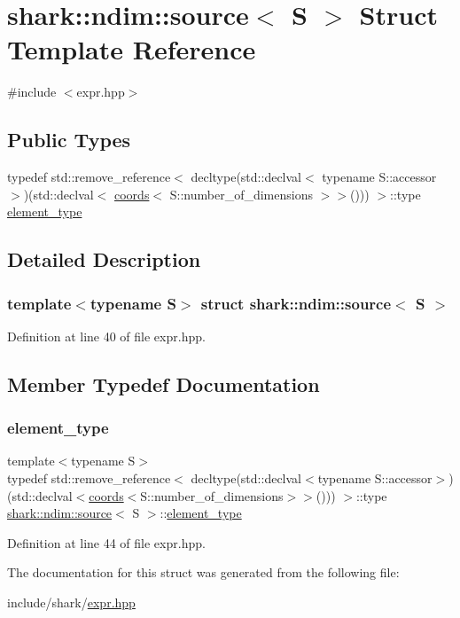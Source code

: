 \hypertarget{structshark_1_1ndim_1_1source}{}\section{shark\+:\+:ndim\+:\+:source$<$ S $>$ Struct Template Reference}
\label{structshark_1_1ndim_1_1source}


{\ttfamily \#include $<$expr.\+hpp$>$}

\subsection*{Public Types}
\begin{DoxyCompactItemize}
\item 
typedef std\+::remove\+\_\+reference$<$ decltype(std\+::declval$<$ typename S\+::accessor $>$)(std\+::declval$<$ \hyperlink{structshark_1_1ndim_1_1coords}{coords}$<$ S\+::number\+\_\+of\+\_\+dimensions $>$$>$())) $>$\+::type \hyperlink{structshark_1_1ndim_1_1source_a088361f7853e6136e1a6fbe5abc17aa3}{element\+\_\+type}
\end{DoxyCompactItemize}


\subsection{Detailed Description}
\subsubsection*{template$<$typename S$>$\newline
struct shark\+::ndim\+::source$<$ S $>$}



Definition at line 40 of file expr.\+hpp.



\subsection{Member Typedef Documentation}
\hypertarget{structshark_1_1ndim_1_1source_a088361f7853e6136e1a6fbe5abc17aa3}{}\label{structshark_1_1ndim_1_1source_a088361f7853e6136e1a6fbe5abc17aa3} 
\subsubsection{\texorpdfstring{element\+\_\+type}{element\_type}}
{\footnotesize\ttfamily template$<$typename S$>$ \\
typedef std\+::remove\+\_\+reference$<$ decltype(std\+::declval$<$typename S\+::accessor$>$)(std\+::declval$<$\hyperlink{structshark_1_1ndim_1_1coords}{coords}$<$S\+::number\+\_\+of\+\_\+dimensions$>$$>$())) $>$\+::type \hyperlink{structshark_1_1ndim_1_1source}{shark\+::ndim\+::source}$<$ S $>$\+::\hyperlink{structshark_1_1ndim_1_1source_a088361f7853e6136e1a6fbe5abc17aa3}{element\+\_\+type}}



Definition at line 44 of file expr.\+hpp.



The documentation for this struct was generated from the following file\+:\begin{DoxyCompactItemize}
\item 
include/shark/\hyperlink{expr_8hpp}{expr.\+hpp}\end{DoxyCompactItemize}
